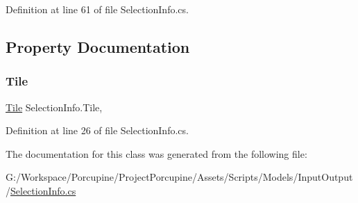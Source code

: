 Definition at line 61 of file Selection\+Info.\+cs.



\subsection{Property Documentation}
\mbox{\label{class_selection_info_a189d6ba2e1bce37b94947ba5974e5096}} 
\subsubsection{\texorpdfstring{Tile}{Tile}}
{\footnotesize\ttfamily \hyperlink{class_tile}{Tile} Selection\+Info.\+Tile\hspace{0.3cm}{\ttfamily [get]}, {}}



Definition at line 26 of file Selection\+Info.\+cs.



The documentation for this class was generated from the following file\+:\begin{DoxyCompactItemize}
\item 
G\+:/\+Workspace/\+Porcupine/\+Project\+Porcupine/\+Assets/\+Scripts/\+Models/\+Input\+Output/\hyperlink{_selection_info_8cs}{Selection\+Info.\+cs}\end{DoxyCompactItemize}
